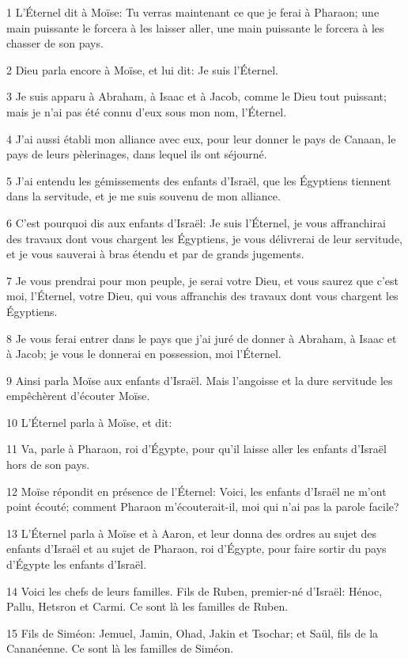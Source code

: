 \par 1 L'Éternel dit à Moïse: Tu verras maintenant ce que je ferai à Pharaon; une main puissante le forcera à les laisser aller, une main puissante le forcera à les chasser de son pays.
\par 2 Dieu parla encore à Moïse, et lui dit: Je suis l'Éternel.
\par 3 Je suis apparu à Abraham, à Isaac et à Jacob, comme le Dieu tout puissant; mais je n'ai pas été connu d'eux sous mon nom, l'Éternel.
\par 4 J'ai aussi établi mon alliance avec eux, pour leur donner le pays de Canaan, le pays de leurs pèlerinages, dans lequel ils ont séjourné.
\par 5 J'ai entendu les gémissements des enfants d'Israël, que les Égyptiens tiennent dans la servitude, et je me suis souvenu de mon alliance.
\par 6 C'est pourquoi dis aux enfants d'Israël: Je suis l'Éternel, je vous affranchirai des travaux dont vous chargent les Égyptiens, je vous délivrerai de leur servitude, et je vous sauverai à bras étendu et par de grands jugements.
\par 7 Je vous prendrai pour mon peuple, je serai votre Dieu, et vous saurez que c'est moi, l'Éternel, votre Dieu, qui vous affranchis des travaux dont vous chargent les Égyptiens.
\par 8 Je vous ferai entrer dans le pays que j'ai juré de donner à Abraham, à Isaac et à Jacob; je vous le donnerai en possession, moi l'Éternel.
\par 9 Ainsi parla Moïse aux enfants d'Israël. Mais l'angoisse et la dure servitude les empêchèrent d'écouter Moïse.
\par 10 L'Éternel parla à Moïse, et dit:
\par 11 Va, parle à Pharaon, roi d'Égypte, pour qu'il laisse aller les enfants d'Israël hors de son pays.
\par 12 Moïse répondit en présence de l'Éternel: Voici, les enfants d'Israël ne m'ont point écouté; comment Pharaon m'écouterait-il, moi qui n'ai pas la parole facile?
\par 13 L'Éternel parla à Moïse et à Aaron, et leur donna des ordres au sujet des enfants d'Israël et au sujet de Pharaon, roi d'Égypte, pour faire sortir du pays d'Égypte les enfants d'Israël.
\par 14 Voici les chefs de leurs familles. Fils de Ruben, premier-né d'Israël: Hénoc, Pallu, Hetsron et Carmi. Ce sont là les familles de Ruben.
\par 15 Fils de Siméon: Jemuel, Jamin, Ohad, Jakin et Tsochar; et Saül, fils de la Cananéenne. Ce sont là les familles de Siméon.
